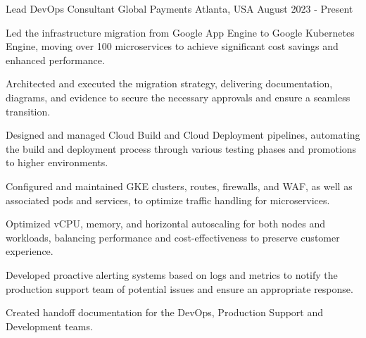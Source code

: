 \textcolor{awesome}{\raisebox{0.1\height}{\faBriefcase\thinspace}}


\begin{cventries}

  \cventry
    {Lead DevOps Consultant} %
    {Global Payments} %
    {Atlanta, USA} %
    {August 2023 - Present} %
    {
      \begin{cvitems} %
        \item {Led the infrastructure migration from Google App Engine to Google Kubernetes Engine, moving over 100 microservices to achieve significant cost savings and enhanced performance.}
        \item {Architected and executed the migration strategy, delivering documentation, diagrams, and evidence to secure the necessary approvals and ensure a seamless transition.}
        \item {Designed and managed Cloud Build and Cloud Deployment pipelines, automating the build and deployment process through various testing phases and promotions to higher environments.}
        \item {Configured and maintained GKE clusters, routes, firewalls, and WAF, as well as associated pods and services, to optimize traffic handling for microservices.}
        \item {Optimized vCPU, memory, and horizontal autoscaling for both nodes and workloads, balancing performance and cost-effectiveness to preserve customer experience.}
        \item {Developed proactive alerting systems based on logs and metrics to notify the production support team of potential issues and ensure an appropriate response.}
        \item {Created handoff documentation for the DevOps, Production Support and Development teams.}
      \end{cvitems}
    }


\end{cventries}
